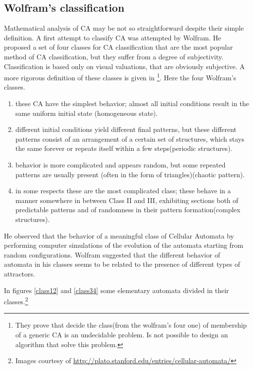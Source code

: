\subsection{Wolfram's classification}
Mathematical analysis of CA may be not so straightforward despite their simple
definition. A first attempt to classify CA was attempted by
Wolfram\cite{wolfram2002}. He proposed a set of four classes for CA
classification that are the most popular method of CA classification, but they
suffer from a degree of subjectivity. Classification is based only on visual
valuations, that are obviously subjective. A more rigorous definition of these
classes is given in \footnote{They prove that decide the class(from the
wolfram's four one) of membership of a generic CA is an undecidable problem. Is
not possible to design an algorithm that solve this problem.}\cite{culik1998}.
Here the four Wolfram's classes.
\begin{enumerate}
  
  \item these CA have the simplest behavior; almost all initial conditions
  result in the same uniform initial state (homogeneous state).
  \item different initial conditions yield different final patterns, but
  these different patterns consist of an arrangement of a certain set of
  structures, which stays the same forever or repeats itself within a few
  steps(periodic structures).
  \item behavior is more complicated and appears random, but some repeated
  patterns are usually present (often in the form of triangles)(chaotic pattern).
  \item in some respects these are the most complicated class; these behave
  in a manner somewhere in between Class II and III, exhibiting sections
  both of predictable patterns and of randomness in their pattern
  formation(complex structures).
\end{enumerate}
He observed that the behavior of a meaningful class of Cellular Automata
by performing computer simulations of the evolution of the automata starting
from random configurations. Wolfram suggested that the different behavior of
automata in his classes seems to be related to the presence of different types
of attractors.

 
In figures \ref{class12} and \ref{class34} some elementary automata divided
in their classes.\footnote{Images courtesy of
\url{http://plato.stanford.edu/entries/cellular-automata/}}

